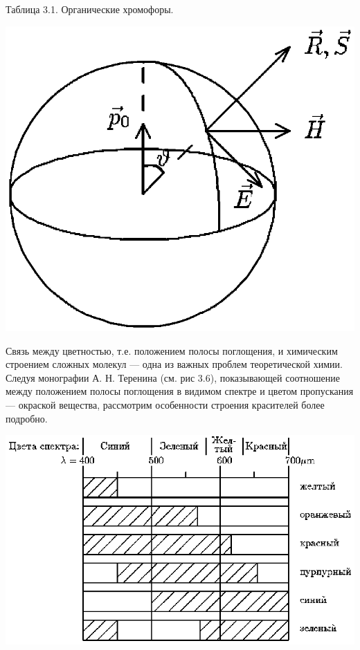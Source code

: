 \vskip -2mm \leftskip 0cm {\ris Таблица 3.1. Органические
хромофоры.}

\vskip 3mm
\centerline{\hbox{\includegraphics[scale=0.7]{Ris/ris_eps/ris3_01.eps}}}

\leftskip 0cm Связь между цветностью, т.е. положением полосы
поглощения, и химическим строением сложных молекул --- одна из
важных проблем теоретической химии. Следуя монографии А. Н.
Теренина (см. рис 3.6), показывающей соотношение между положением
полосы поглощения в видимом спектре и цветом пропускания ---
окраской вещества, рассмотрим особенности строения красителей
более подробно.

\vskip 3mm
\centerline{\hbox{\includegraphics[scale=0.7]{Ris/ris_eps/ris3_06.eps}}}

